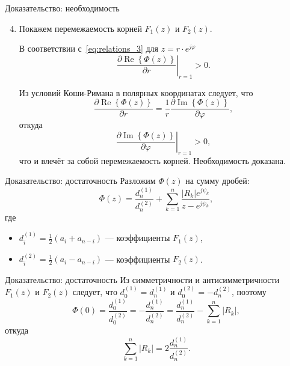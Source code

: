 \documentclass[notheorems,aspectratio=169]{beamer}
\theoremstyle{definition}
\newcommand{\abs}[1]{\left| #1 \right|}
\newcommand{\paren}[1]{\left(#1\right)}
\renewcommand{\Re}{\operatorname{Re}}
\renewcommand{\Im}{\operatorname{Im}}
\begin{document}
\begin{frame}{Доказательство: необходимость}
  \begin{enumerate}
    \setcounter{enumi}{3}
  \item Покажем перемежаемость корней $F_1(z)$ и $F_2(z)$.

    В соответствии с~\eqref{eq:relations_3} для $z = r \cdot e^{j\varphi}$
    \begin{equation*}
      \left. \frac{\partial \Re \left\{ \Phi(z) \right\}}{\partial r} \right|_{r=1} > 0.
    \end{equation*}

    Из условий Коши-Римана в полярных координатах следует, что
    \begin{equation*}
      \frac{\partial \Re \left\{ \Phi(z) \right\}}{\partial r} = \frac{1}{r} \frac{\partial \Im\left\{ \Phi(z) \right\}}{\partial \varphi},
    \end{equation*}
    откуда
    \begin{equation*}
      \left. \frac{\partial \Im\left\{ \Phi(z) \right\}}{\partial \varphi} \right|_{r=1} > 0,
    \end{equation*}
    что и влечёт за собой перемежаемость корней. Необходимость доказана.
  \end{enumerate}
\end{frame}

\begin{frame}{Доказательство: достаточность}
  Разложим $\Phi(z)$ на сумму дробей:
  \begin{equation*}
    \Phi(z) = \frac{d_n^{(1)}}{d_n^{(2)}} + \sum_{k=1}^n \frac{\abs{R_k} e^{j \psi_k}}{z - e^{j \psi_k}},
  \end{equation*}
  где
  \begin{itemize}
  \item $d_i^{(1)} = \frac{1}{2}\paren{a_i + a_{n - i}}$ --- коэффициенты $F_1(z)$,
  \item $d_i^{(2)} = \frac{1}{2}\paren{a_i - a_{n - i}}$ --- коэффициенты $F_2(z)$.
  \end{itemize}
\end{frame}

\begin{frame}{Доказательство: достаточность}
  Из симметричности и антисимметричности $F_1(z)$ и $F_2(z)$ следует, что $d_0^{(1)} = d_n^{(1)}$ и $d_0^{(2)} = -d_n^{(2)}$,
  поэтому
  \begin{equation*}
    \Phi(0) = \frac{d_0^{(1)}}{d_0^{(2)}} = -\frac{d_n^{(1)}}{d_n^{(2)}} = \frac{d_n^{(1)}}{d_n^{(2)}} - \sum_{k=1}^n \abs{R_k},
  \end{equation*}
  откуда
 \begin{equation*}
    \sum_{k=1}^n \abs{R_k} = 2 \frac{d_n^{(1)}}{d_n^{(2)}}.
  \end{equation*}
\end{frame}
\end{document}
